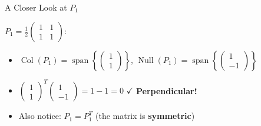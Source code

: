 \documentclass[10pt]{beamer}
\theoremstyle{definition}
\newcommand{\x}[1]{\alert{\textbf{#1}}}
\begin{document}
\begin{frame}{A Closer Look at $P_1$}

$P_1 = \frac{1}{2}\begin{pmatrix} 1 & 1 \\ 1 & 1 \end{pmatrix}$:

\vspace{0.3em}

\begin{itemize}
\item $\operatorname{Col}(P_1) = \operatorname{span}\left\{\begin{pmatrix} 1 \\ 1 \end{pmatrix}\right\}$, \quad $\operatorname{Null}(P_1) = \operatorname{span}\left\{\begin{pmatrix} 1 \\ -1 \end{pmatrix}\right\}$

\vspace{0.3em}

\item $\begin{pmatrix} 1 \\ 1 \end{pmatrix}^T \begin{pmatrix} 1 \\ -1 \end{pmatrix} = 1 - 1 = 0$ $\checkmark$ \quad \x{Perpendicular!}

\vspace{0.3em}

\item Also notice: $P_1 = P_1^T$ \quad (the matrix is \x{symmetric})
\end{itemize}

\end{frame}
\end{document}
